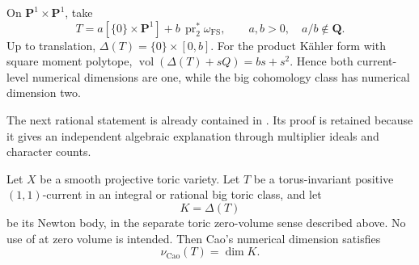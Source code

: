 \begin{example}\label{ex:ok-real-toric-segment}
On $\mathbf P^1\times\mathbf P^1$, take
\[
 T=a[\{0\}\times\mathbf P^1]
      +b\,\operatorname{pr}_2^*\omega_{\mathrm{FS}},
 \qquad a,b>0,\quad a/b\notin\mathbf Q.
\]
Up to translation, $\Delta(T)=\{0\}\times[0,b]$.  For the product
K\"ahler form with square moment polytope,
$\operatorname{vol}(\Delta(T)+sQ)=bs+s^2$.  Hence both current-level
numerical dimensions are one, while the big cohomology class has numerical
dimension two.
\end{example}

The next rational statement is already contained in
.  Its proof is retained because it gives an
independent algebraic explanation through multiplier ideals and character
counts.

\par\noindent\begin{minipage}{\linewidth}
\begin{corollary}\label{thm:ok-toric-zero-mass}
Let $X$ be a smooth projective toric variety.
Let $T$ be a torus-invariant positive $(1,1)$-current in an integral or
rational big toric class, and let
\[
                             K=\Delta(T)
\]
be its Newton body, in the separate toric zero-volume sense described
above.  No use of  at zero volume is
intended.
Then Cao's numerical dimension satisfies
\[
                         \nu_{\mathrm{Cao}}(T)=\dim K.
\tag{55.59}\label{eq:ok-toric-numdim}
\]
\end{corollary}
\end{minipage}\par



